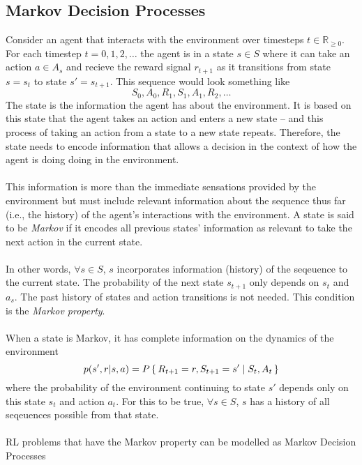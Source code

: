 \subsection{Markov Decision Processes}
Consider an agent that interacts with the environment over timesteps 
$t \in \mathbb{R}_{\geq 0}$. For each timestep $t=0,1,2,\ldots$ the agent is in a state
$s \in S$ where it can take an action $a \in A_s$ and recieve the reward signal $r_{t+1}$ 
as it transitions from state $s=s_t$ to state $s'=s_{t+1}$. This sequence would look
something like
\begin{equation}
    S_0, A_0, R_1, S_1, A_1, R_2, \ldots
\end{equation}
The state is the information the agent has about the environment. It is based on this
state that the agent takes an action and enters a new state -- and this
process of taking an action from a state to a new state repeats. Therefore, the state
needs to encode information that allows a decision in the context of how the agent is doing 
doing in the environment.
\\\\
This information is more than the immediate sensations provided by the environment but must
include relevant information about the sequence thus far (i.e., the history) of the agent's 
interactions with the environment. A state is said to be \textit{Markov} if it encodes
all previous states' information as relevant to take the next action in the current state.
\\\\
In other words, $\forall s \in S$, $s$ incorporates information (history) of the seqeuence
to the current state.
The probability of the next state $s_{t+1}$ only depends on $s_{t}$ and $a_s$. 
The past history of states and action transitions is not needed.
This condition is the \textit{Markov property}. 
\\\\
When a state is Markov, it has complete information on the dynamics of the 
environment
\begin{equation}
    p(s', r | s, a) = P\set{R_{t+1}=r, S_{t+1}=s'|S_t, A_t}
\end{equation} where the probability of the environment continuing to state 
$s'$ depends only on this state $s_{t}$ and action $a_{t}$. 
For this to be true, $\forall s \in S$, $s$ has a history of all seqeuences 
possible from that state. 
\\\\
RL problems that have the Markov property can be modelled as Markov Decision Processes 
